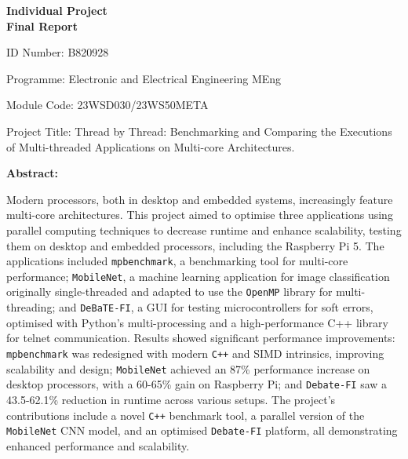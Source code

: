 \documentclass[12pt, openany]{book}
\begin{document}
\begin{titlepage}
	\centering
	\vspace*{1cm} %
	{\Huge\bfseries Individual Project\\[0.5cm] Final Report\par}
	\vspace{2cm}
	\raggedright
	ID Number: B820928\par
	
	Programme: Electronic and Electrical Engineering MEng\par
	
	Module Code: 23WSD030/23WS50META\par
	
	Project Title: Thread by Thread: Benchmarking and Comparing the Executions of Multi-threaded Applications on Multi-core Architectures.\par
	
	\textbf{Abstract:}\par %

	Modern processors, both in desktop and embedded systems, increasingly feature multi-core architectures. This project aimed to optimise three applications using parallel computing techniques to decrease runtime and enhance scalability, testing them on desktop and embedded processors, including the Raspberry Pi 5. The applications included \texttt{mpbenchmark}, a benchmarking tool for multi-core performance; \texttt{MobileNet}, a machine learning application for image classification originally single-threaded and adapted to use the \texttt{OpenMP} library for multi-threading; and \texttt{DeBaTE-FI}, a GUI for testing microcontrollers for soft errors, optimised with Python’s multi-processing and a high-performance C++ library for telnet communication. Results showed significant performance improvements: \texttt{mpbenchmark} was redesigned with modern \texttt{C++} and SIMD intrinsics, improving scalability and design; \texttt{MobileNet} achieved an 87\% performance increase on desktop processors, with a 60-65\% gain on Raspberry Pi; and \texttt{Debate-FI} saw a 43.5-62.1\% reduction in runtime across various setups. The project's contributions include a novel \texttt{C++} benchmark tool, a parallel version of the \texttt{MobileNet} CNN model, and an optimised \texttt{Debate-FI} platform, all demonstrating enhanced performance and scalability.

\end{titlepage}
\end{document}
